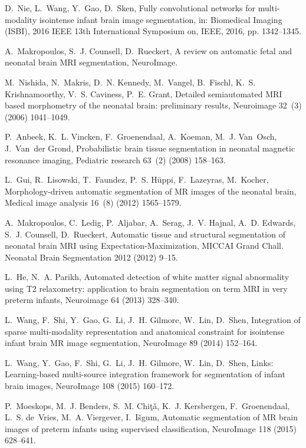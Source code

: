 \documentclass[twoside,espcrc2]{elsarticle}
\begin{document}
\begin{thebibliography}{10}
D.~Nie, L.~Wang, Y.~Gao, D.~Sken, Fully convolutional networks for
  multi-modality isointense infant brain image segmentation, in: Biomedical
  Imaging (ISBI), 2016 IEEE 13th International Symposium on, IEEE, 2016, pp.
  1342--1345.

A.~Makropoulos, S.~J. Counsell, D.~Rueckert, A review on automatic fetal and
  neonatal brain {MRI} segmentation, NeuroImage.

M.~Nishida, N.~Makris, D.~N. Kennedy, M.~Vangel, B.~Fischl, K.~S.
  Krishnamoorthy, V.~S. Caviness, P.~E. Grant, Detailed semiautomated {MRI}
  based morphometry of the neonatal brain: preliminary results, Neuroimage
  32~(3) (2006) 1041--1049.

P.~Anbeek, K.~L. Vincken, F.~Groenendaal, A.~Koeman, M.~J. Van~Osch, J.~Van~der
  Grond, Probabilistic brain tissue segmentation in neonatal magnetic resonance
  imaging, Pediatric research 63~(2) (2008) 158--163.

L.~Gui, R.~Lisowski, T.~Faundez, P.~S. H{\"u}ppi, F.~Lazeyras, M.~Kocher,
  Morphology-driven automatic segmentation of {MR} images of the neonatal
  brain, Medical image analysis 16~(8) (2012) 1565--1579.

A.~Makropoulos, C.~Ledig, P.~Aljabar, A.~Serag, J.~V. Hajnal, A.~D. Edwards,
  S.~J. Counsell, D.~Rueckert, Automatic tissue and structural segmentation of
  neonatal brain {MRI} using {E}xpectation-{M}aximization, MICCAI Grand Chall.
  Neonatal Brain Segmentation 2012 (2012) 9--15.

L.~He, N.~A. Parikh, Automated detection of white matter signal abnormality
  using {T2} relaxometry: application to brain segmentation on term {MRI} in
  very preterm infants, Neuroimage 64 (2013) 328--340.

L.~Wang, F.~Shi, Y.~Gao, G.~Li, J.~H. Gilmore, W.~Lin, D.~Shen, Integration of
  sparse multi-modality representation and anatomical constraint for isointense
  infant brain {MR} image segmentation, NeuroImage 89 (2014) 152--164.

L.~Wang, Y.~Gao, F.~Shi, G.~Li, J.~H. Gilmore, W.~Lin, D.~Shen, Links:
  Learning-based multi-source integration framework for segmentation of infant
  brain images, NeuroImage 108 (2015) 160--172.

P.~Moeskops, M.~J. Benders, S.~M. Chi{\c{t}}ǎ, K.~J. Kersbergen,
  F.~Groenendaal, L.~S. de~Vries, M.~A. Viergever, I.~I{\v{s}}gum, Automatic
  segmentation of {MR} brain images of preterm infants using supervised
  classification, NeuroImage 118 (2015) 628--641.


\end{thebibliography}
\end{document}

